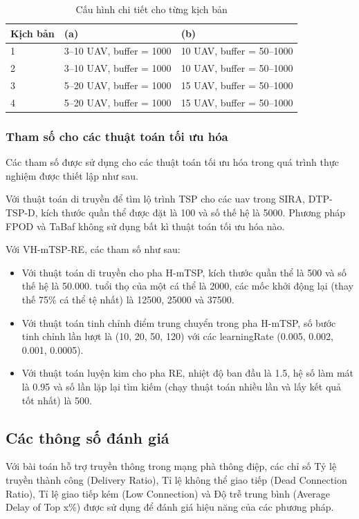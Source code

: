 \documentclass[a4paper]{article}
\begin{document}
\begin{table}
\centering
\begin{tabular}{l|l|l}
\toprule
\textbf{Kịch bản} & \textbf{(a)} & \textbf{(b)} \\ 
\midrule
1 & 3--10 UAV, buffer = 1000 & 10 UAV, buffer = 50--1000 \\ 
2 & 3--10 UAV, buffer = 1000 & 10 UAV, buffer = 50--1000 \\ 
3 & 5--20 UAV, buffer = 1000 & 15 UAV, buffer = 50--1000 \\ 
4 & 5--20 UAV, buffer = 1000 & 15 UAV, buffer = 50--1000 \\ 
\bottomrule
\end{tabular}
\caption{Cấu hình chi tiết cho từng kịch bản}
\label{tab:scenario_config}
\end{table}

\subsubsection{Tham số cho các thuật toán tối ưu hóa}
Các tham số được sử dụng cho các thuật toán tối ưu hóa trong quá trình thực nghiệm được thiết lập như sau.

Với thuật toán di truyền để tìm lộ trình TSP cho các uav trong SIRA, DTP-TSP-D, kích thước quần thể được đặt là 100 và số thế hệ là 5000. Phương pháp FPOD và TaBaf không sử dụng bất kì thuật toán tối ưu hóa nào.

Với VH-mTSP-RE, các tham số như sau:
\begin{itemize}
  \item Với thuật toán di truyền cho pha H-mTSP, kích thước quần thể là 500 và số thế hệ là 50.000. tuổi thọ của một cá thể là 2000, các mốc khởi động lại (thay thế 75\% cá thể tệ nhất) là 12500, 25000 và 37500.
  \item Với thuật toán tinh chỉnh điểm trung chuyển trong pha H-mTSP, số bước tinh chỉnh lần lượt là (10, 20, 50, 120) với các learningRate (0.005, 0.002, 0.001, 0.0005).
  \item Với thuật toán luyện kim cho pha RE, nhiệt độ ban đầu là 1.5, hệ số làm mát là 0.95 và số lần lặp lại tìm kiếm (chạy thuật toán nhiều lần và lấy kết quả tốt nhất) là 500.
\end{itemize}

\subsection{Các thông số đánh giá}
Với bài toán hỗ trợ truyền thông trong mạng phà thông điệp, các chỉ số Tỷ lệ truyền thành công (Delivery Ratio), Tỉ lệ không thể giao tiếp (Dead Connection Ratio), Tỉ lệ giao tiếp kém (Low Connection) và Độ trễ trung bình (Average Delay of Top x\%) được sử dụng để đánh giá hiệu năng của các phương pháp. 
\end{document}
